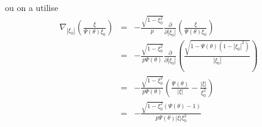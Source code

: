  ou on a utilise \begin{eqnarray*}
\nabla_{\left|\xi_{0}\right|}\left(\frac{\xi}{\Psi(\theta)\xi_{0}}\right) & = & -\frac{\sqrt{1-\xi_{0}^{2}}}{p}\frac{\partial}{\partial\left|\xi_{0}\right|}\left(\frac{\xi}{\Psi(\theta)\xi_{0}}\right)\\
 & = & -\frac{\sqrt{1-\xi_{0}^{2}}}{p\Psi(\theta)}\frac{\partial}{\partial\left|\xi_{0}\right|}\left(\frac{\sqrt{1-\Psi(\theta)(1-\left|\xi_{0}\right|^{2})}}{\left|\xi_{0}\right|}\right)\\
 & = & -\frac{\sqrt{1-\xi_{0}^{2}}}{p\Psi(\theta)}\left(\frac{\Psi(\theta)}{\left|\xi\right|}-\frac{\left|\xi\right|}{\xi_{0}^{2}}\right)\\
 & = & -\frac{\sqrt{1-\xi_{0}^{2}}\left(\Psi(\theta)-1\right)}{p\Psi(\theta)\left|\xi\right|\xi_{0}^{2}}\end{eqnarray*}


